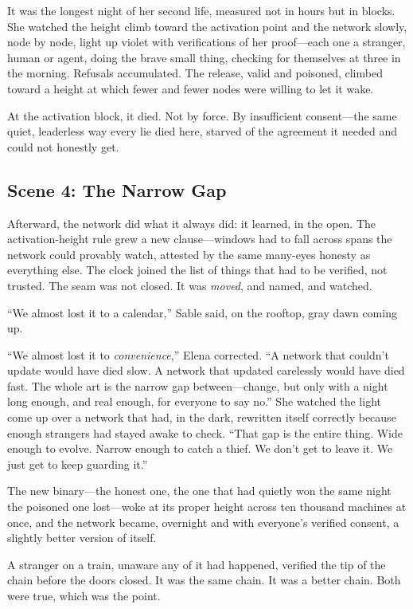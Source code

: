 It was the longest night of her second life, measured not in hours but in blocks.
She watched the height climb toward the activation point and the network slowly,
node by node, light up violet with verifications of her proof---each one a stranger,
human or agent, doing the brave small thing, checking for themselves at three in
the morning. Refusals accumulated. The release, valid and poisoned, climbed toward
a height at which fewer and fewer nodes were willing to let it wake.

At the activation block, it died. Not by force. By insufficient consent---the same
quiet, leaderless way every lie died here, starved of the agreement it needed and
could not honestly get.

\hypertarget{scene-4-the-narrow-gap}{%
\subsection{Scene 4: The Narrow
Gap}\label{scene-4-the-narrow-gap}}

Afterward, the network did what it always did: it learned, in the open. The
activation-height rule grew a new clause---windows had to fall across spans the
network could provably watch, attested by the same many-eyes honesty as everything
else. The clock joined the list of things that had to be verified, not trusted. The
seam was not closed. It was \emph{moved}, and named, and watched.

``We almost lost it to a calendar,'' Sable said, on the rooftop, gray dawn coming
up.

``We almost lost it to \emph{convenience},'' Elena corrected. ``A network that
couldn't update would have died slow. A network that updated carelessly would have
died fast. The whole art is the narrow gap between---change, but only with a night
long enough, and real enough, for everyone to say no.'' She watched the light come
up over a network that had, in the dark, rewritten itself correctly because enough
strangers had stayed awake to check. ``That gap is the entire thing. Wide enough to
evolve. Narrow enough to catch a thief. We don't get to leave it. We just get to
keep guarding it.''

The new binary---the honest one, the one that had quietly won the same night the
poisoned one lost---woke at its proper height across ten thousand machines at once,
and the network became, overnight and with everyone's verified consent, a slightly
better version of itself.

A stranger on a train, unaware any of it had happened, verified the tip of the
chain before the doors closed. It was the same chain. It was a better chain. Both
were true, which was the point.


